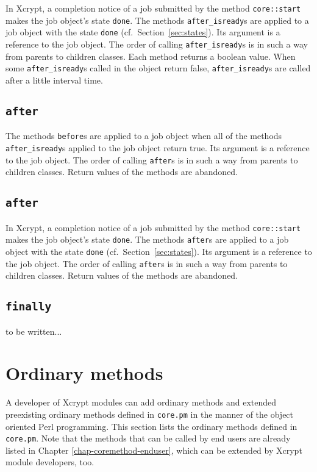 \documentclass[a4paper,10pt]{report}
\def\|{\verb|} %|
\begin{document}
In Xcrypt, a completion notice of a job submitted by the method
 \|core::start| makes the job object's state \|done|.  The methods
 \texttt{after\_isready}s are applied to a job object with the state
 \|done| (cf.\ Section~\ref{sec:states}).  Its argument is a reference
 to the job object.  The order of calling \texttt{after\_isready}s is
 in such a way from parents to children classes.  Each method
 returns a boolean value.  When some \texttt{after\_isready}s called
 in the object return false, \texttt{after\_isready}s are called
 after a little interval time.

\subsection{\texttt{after}}

The methods \texttt{before}s are applied to a job object when all of
the methods \texttt{after\_isready}s applied to the job object return
true.  Its argument is a reference to the job object.  The order of
calling \texttt{after}s is in such a way from parents to children classes.
Return values of the methods are abandoned.
\fi

\subsection{\texttt{after}}

In Xcrypt, a completion notice of a job submitted by the method
 \|core::start| makes the job object's state \|done|.  The methods
 \texttt{after}s are applied to a job object with the state \|done|
 (cf.\ Section~\ref{sec:states}).  Its argument is a reference to the
 job object.  The order of calling \texttt{after}s is in such a way
 from parents to children classes.  Return values of the methods are
 abandoned.

\subsection{\texttt{finally}}
to be written...

\section{Ordinary methods}\label{apd-coremethod-developer}
A developer of Xcrypt modules can add ordinary methods and
extended preexisting ordinary methods defined in \|core.pm|
in the manner of the object oriented Perl programming.
This section lists the ordinary methods defined in \|core.pm|.
Note that the methods that can be called by end users are
already listed in Chapter \ref{chap-coremethod-enduser},
which can be extended by Xcrypt module developers, too.
\end{document}
